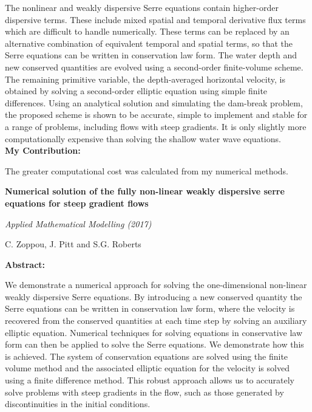 The nonlinear and weakly dispersive Serre equations contain higher-order dispersive terms. These include mixed spatial and temporal derivative flux terms which are difficult to handle numerically. These terms can be replaced by an alternative combination of equivalent temporal and spatial terms, so that the Serre equations can be written in conservation law form. The water depth and new conserved quantities are evolved using a second-order finite-volume scheme. The remaining primitive variable, the depth-averaged horizontal velocity, is obtained by solving a second-order elliptic equation using simple finite differences. Using an analytical solution and simulating the dam-break problem, the proposed scheme is shown to be accurate, simple to implement and stable for a range of problems, including flows with steep gradients. It is only slightly more computationally expensive than solving the shallow water wave equations. \\
\textbf{My Contribution:}

The greater computational cost was calculated from my numerical methods.  
\vspace*{\baselineskip}
\begin{center}
	\textbf{
		\Large Numerical solution of the fully non-linear weakly dispersive
		serre equations for steep gradient flows}
	
	\vspace*{\baselineskip}
	
	\textit{Applied Mathematical Modelling (2017)}
	
	{C. Zoppou, J. Pitt and S.G. Roberts}
	\vspace*{0.5\baselineskip}
\end{center}
\textbf{Abstract:}

We demonstrate a numerical approach for solving the one-dimensional non-linear weakly dispersive Serre equations. By introducing a new conserved quantity the Serre equations can be written in conservation law form, where the velocity is recovered from the conserved quantities at each time step by solving an auxiliary elliptic equation. Numerical techniques for solving equations in conservative law form can then be applied to solve the	Serre equations. We demonstrate how this is achieved. The system of conservation equations are solved using the finite volume method and the associated elliptic equation for the velocity is solved using a finite difference method. This robust approach allows us to accurately solve problems with steep gradients in the flow, such as those generated by discontinuities in the initial conditions.

